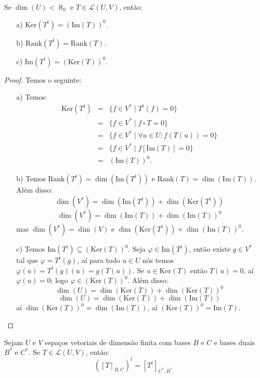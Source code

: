 \documentclass[11pt,twoside,a4paper]{book}
\begin{document}
\begin{proposicao}
Se $\dim(U)<\aleph_0$ e $T\in\mathcal{L}(U,V)$, então:
\begin{itemize}
\item[a)] $\mathrm{Ker}(T^t)=(\mathrm{Im}(T))^0$.
\item[b)] $\mathrm{Rank}(T^t)=\mathrm{Rank}(T)$.
\item[c)] $\mathrm{Im}(T^t)=(\mathrm{Ker}(T))^0$.
\end{itemize}
\end{proposicao}
\begin{proof}
Temos o seguinte:
\begin{itemize}
\item[a)] Temos:
\[
\begin{array}{rcl}
\mathrm{Ker}(T^t)&=&\{f\in V^*\mid T^t(f)=0\}\\&=&\{f\in V^*\mid f\circ T=0\}\\&=&\{f\in V^*\mid \forall u\in U:f(T(u))=0\}\\&=&\{f\in V^*\mid f[\mathrm{Im}(T)]=0\}\\&=&(\mathrm{Im}(T))^0.
\end{array}
\]
\item[b)] Temos $\mathrm{Rank}(T^t)=\dim(\mathrm{Im}(T^t))$ e $\mathrm{Rank}(T)=\dim(\mathrm{Im}(T))$. Além disso:
\[
\dim(V^*)=\dim(\mathrm{Im}(T^t))+\dim(\mathrm{Ker}(T^t))
\]
\[
\dim(V^*)=\dim(\mathrm{Im}(T))+\dim(\mathrm{Im}(T))^0
\]
mas $\dim(V^*)=\dim(V)$ e $\dim(\mathrm{Ker}(T^t))+\dim(\mathrm{Im}(T))^0$.
\item[c)] Temos $\mathrm{Im}(T^t)\subseteq(\mathrm{Ker}(T))^0$. Seja $\varphi\in\mathrm{Im}(T^t)$, então existe $g\in V^*$ tal que $\varphi=T^t(g)$, aí para todo $u\in U$ nós temos $\varphi(u)=T^t(g)(u)=g(T(u))$. Se $u\in\mathrm{Ker}(T)$ então $T(u)=0$, aí $\varphi(u)=0$; logo $\varphi\in(\mathrm{Ker}(T))^0$. Além disso:
\[
\dim(U)=\dim(\mathrm{Ker}(T))+\dim(\mathrm{Ker}(T))^0
\]
\[
\dim(U)=\dim(\mathrm{Ker}(T))+\dim(\mathrm{Im}(T))
\]
aí $\dim(\mathrm{Ker}(T))^0=\dim(\mathrm{Im}(T))$, aí $(\mathrm{Ker}(T))^0=\mathrm{Im}(T)$.
\end{itemize}
\end{proof}

\begin{teorema}
Sejam $U$ e $V$ espaços vetoriais de dimensão finita com bases $B$ e $C$ e bases duais $B^*$ e $C^*$. Se $T\in\mathcal{L}(U,V)$, então:
\[
([T]_{B,C})^t=[T^t]_{C^*,B^*}
\]
\end{teorema}
\end{document}
